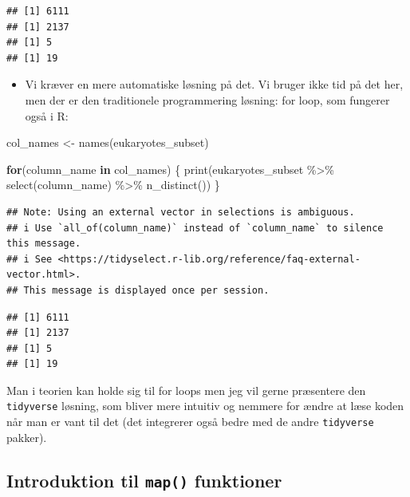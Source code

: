 \documentclass[
]{book}
\newenvironment{Shaded}{\begin{snugshade}}{\end{snugshade}}
\newcommand{\ControlFlowTok}[1]{\textcolor[rgb]{0.13,0.29,0.53}{\textbf{#1}}}
\newcommand{\FunctionTok}[1]{\textcolor[rgb]{0.00,0.00,0.00}{#1}}
\newcommand{\NormalTok}[1]{#1}
\newcommand{\OtherTok}[1]{\textcolor[rgb]{0.56,0.35,0.01}{#1}}
\newcommand{\SpecialCharTok}[1]{\textcolor[rgb]{0.00,0.00,0.00}{#1}}
\providecommand{\tightlist}{%
  \setlength{\itemsep}{0pt}\setlength{\parskip}{0pt}}
\begin{document}
\begin{verbatim}
## [1] 6111
## [1] 2137
## [1] 5
## [1] 19
\end{verbatim}

\begin{itemize}
\tightlist
\item
  Vi kræver en mere automatiske løsning på det. Vi bruger ikke tid på det her, men der er den traditionele programmering løsning: for loop, som fungerer også i R:
\end{itemize}

\begin{Shaded}
\begin{Highlighting}[]
\NormalTok{col\_names }\OtherTok{\textless{}{-}} \FunctionTok{names}\NormalTok{(eukaryotes\_subset)}

\ControlFlowTok{for}\NormalTok{(column\_name }\ControlFlowTok{in}\NormalTok{ col\_names)}
\NormalTok{\{}
  \FunctionTok{print}\NormalTok{(eukaryotes\_subset }\SpecialCharTok{\%\textgreater{}\%} 
          \FunctionTok{select}\NormalTok{(column\_name) }\SpecialCharTok{\%\textgreater{}\%} 
          \FunctionTok{n\_distinct}\NormalTok{())}
\NormalTok{\}}
\end{Highlighting}
\end{Shaded}

\begin{verbatim}
## Note: Using an external vector in selections is ambiguous.
## i Use `all_of(column_name)` instead of `column_name` to silence this message.
## i See <https://tidyselect.r-lib.org/reference/faq-external-vector.html>.
## This message is displayed once per session.
\end{verbatim}

\begin{verbatim}
## [1] 6111
## [1] 2137
## [1] 5
## [1] 19
\end{verbatim}

Man i teorien kan holde sig til for loops men jeg vil gerne præsentere den \texttt{tidyverse} løsning, som bliver mere intuitiv og nemmere for ændre at læse koden når man er vant til det (det integrerer også bedre med de andre \texttt{tidyverse} pakker).

\hypertarget{introduktion-til-map-funktioner}{%
\subsection{\texorpdfstring{Introduktion til \texttt{map()} funktioner}{Introduktion til map() funktioner}}\label{introduktion-til-map-funktioner}}
\end{document}
